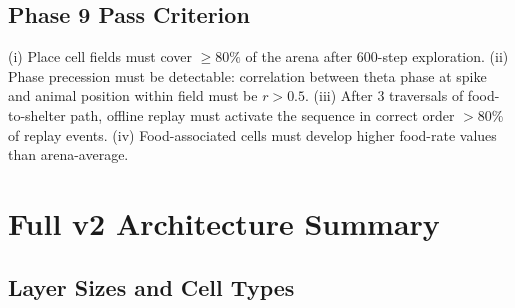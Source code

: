 \documentclass[11pt,a4paper]{article}
\begin{document}
\subsection{Phase 9 Pass Criterion}

(i) Place cell fields must cover $\geq 80\%$ of the arena after 600-step exploration.
(ii) Phase precession must be detectable: correlation between theta phase at spike
and animal position within field must be $r > 0.5$.
(iii) After 3 traversals of food-to-shelter path, offline replay must activate
the sequence in correct order $>80\%$ of replay events.
(iv) Food-associated cells must develop higher food-rate values than arena-average.

\section{Full v2 Architecture Summary}\label{sec:summary}

\subsection{Layer Sizes and Cell Types}
\end{document}
